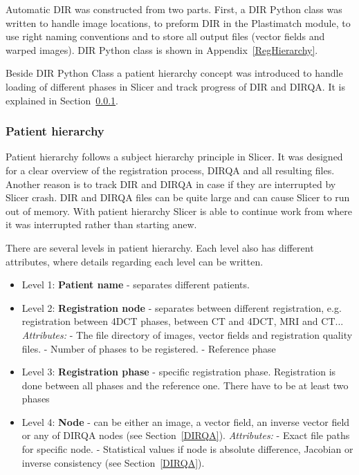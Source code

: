 \documentclass[type=dr, dr=rernat, accentcolor=tud7b,colorbacktitle, bigchapter, openright, twoside, 12pt ]{tudthesis}
\begin{document}
Automatic DIR was constructed from two parts. First, a DIR Python class was written to handle image locations, to preform DIR in the Plastimatch module, to use right naming conventions and to store all output files (vector fields and warped images). 
DIR Python class is shown in Appendix~\ref{RegHierarchy}.

Beside DIR Python Class a patient hierarchy concept was introduced to handle loading of different phases in Slicer and track progress of DIR and DIRQA. It is explained in Section~\ref{PatHierarchy}.


\subsubsection{Patient hierarchy} 
\label{PatHierarchy}

Patient hierarchy follows a subject hierarchy principle in Slicer. It was designed for a clear overview of the registration process, DIRQA and all resulting files. Another reason is to track DIR
and DIRQA in case if they are interrupted by Slicer crash. DIR and DIRQA files can be quite large and can cause Slicer to run out of memory. With patient hierarchy Slicer is able to continue work
from where it was interrupted rather than starting anew.

There are several levels in patient hierarchy. Each level also has different attributes, where details regarding each level can be written.

\begin{itemize}
	\item Level 1: \textbf{Patient name} - separates different patients.
	\item Level 2: \textbf{Registration node} - separates between different registration, e.g. registration between 4DCT phases, between CT and 4DCT, MRI and CT... 
	\subitem \textit{Attributes:}
	\subitem - The file directory of images, vector fields and registration quality files.
	\subitem - Number of phases to be registered.
	\subitem - Reference phase
	\item Level 3: \textbf{Registration phase} - specific registration phase. Registration is done between all phases and the reference one. There have to be at least two phases
	\item Level 4: \textbf{Node} - can be either an image, a vector field, an inverse vector field or any of DIRQA nodes (see Section~\ref{DIRQA}).
	\subitem \textit{Attributes:}
	\subitem - Exact file paths for specific node.
	\subitem - Statistical values if node is absolute difference, Jacobian or inverse consistency (see Section~\ref{DIRQA}).
\end{itemize}
\end{document}
